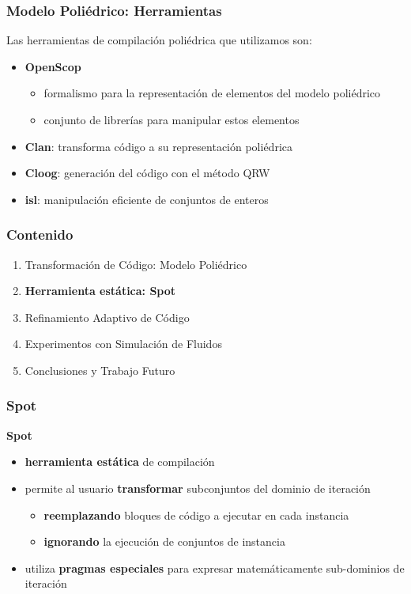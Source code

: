 \documentclass{beamer}\usetheme{Madrid} %
\begin{document}
\begin{frame}
\frametitle{Modelo Poliédrico: Herramientas}
Las herramientas de compilación poliédrica que utilizamos son: 
\begin{itemize}
\item \textbf{OpenScop}
\begin{itemize}
\item formalismo para la representación de elementos del modelo poliédrico
\item conjunto de librerías para manipular estos elementos
\end{itemize}
\item \textbf{Clan}: transforma código a su representación poliédrica
\item \textbf{Cloog}: generación del código con el método QRW
\item \textbf{isl}: manipulación eficiente de conjuntos de enteros
\end{itemize}
\end{frame}
\begin{frame} 
\frametitle{Contenido} 
\begin{enumerate}
\item Transformación de Código: Modelo Poliédrico
\item \textbf{Herramienta estática: Spot}
\item Refinamiento Adaptivo de Código
\item Experimentos con Simulación de Fluidos
\item Conclusiones y Trabajo Futuro
\end{enumerate}
\end{frame} 
\begin{frame} 
\frametitle{Spot}
\textbf{Spot}
\begin{itemize}
	\item \textbf{herramienta estática} de compilación
	\item permite al usuario \textbf{transformar} subconjuntos del dominio de iteración
	\begin{itemize}
		\item \textbf{reemplazando} bloques de código a ejecutar en cada instancia
		\item \textbf{ignorando} la ejecución de conjuntos de instancia
	\end{itemize}
	\item utiliza \textbf{pragmas especiales} para expresar matemáticamente sub-dominios de iteración 
\end{itemize}
\end{frame}
\end{document}
